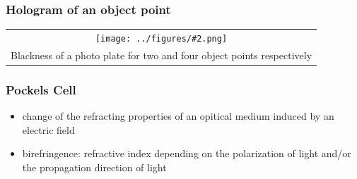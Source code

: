 \documentclass[10pt]{beamer}
\newcommand{\gra}[3][]{
	\begin{table}
	\centering
	\begin{tabular}[width=\textwidth]{c}
		\texttt{[image: ../figures/\#2.png]}\\
		\small #3
	\end{tabular}
	\end{table}
}
\begin{document}
\begin{frame}
	\frametitle{Hologram of an object point}
	\gra[0.5]{obj2}{Blackness of a photo plate for two and four object points respectively \footfullcite{staats}}
\end{frame}

\begin{frame}
	\frametitle{Pockels Cell}
	\begin{itemize}
	\item change of the refracting properties of an opitical medium induced by an electric field
	\item birefringence: refractive index depending on the polarization of light and/or the propagation direction of light
	\end{itemize}
\end{frame}
\end{document}
